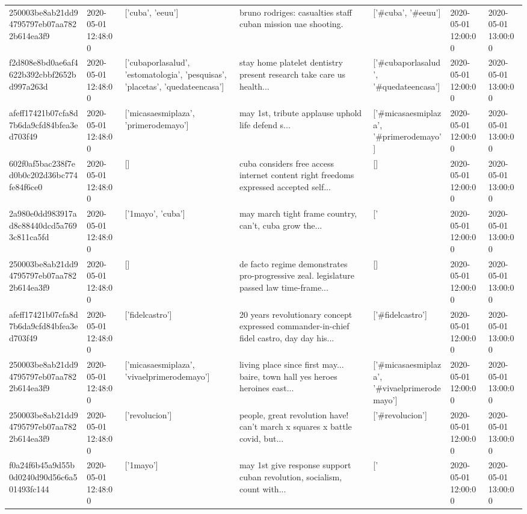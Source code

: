 \begin{tabular}{lllllll}
250003be8ab21dd94795797eb07aa7822b614ea3f9 & 2020-05-01 12:48:00 & ['cuba', 'eeuu'] & bruno rodriges: casualties staff cuban mission uae shooting. & ['#cuba', '#eeuu'] & 2020-05-01 12:00:00 & 2020-05-01 13:00:00 \\
f2d808e8bd0ae6af4622b392cbbf2652bd997a263d & 2020-05-01 12:48:00 & ['cubaporlasalud', 'estomatologia', 'pesquisas', 'placetas', 'quedateencasa'] & stay home platelet dentistry present research take care us health... & ['#cubaporlasalud', '#quedateencasa'] & 2020-05-01 12:00:00 & 2020-05-01 13:00:00 \\
afeff17421b07cfa8d7b6da9cfd84bfea3ed703f49 & 2020-05-01 12:48:00 & ['micasaesmiplaza', 'primerodemayo'] & may 1st, tribute applause uphold life defend s... & ['#micasaesmiplaza', '#primerodemayo'] & 2020-05-01 12:00:00 & 2020-05-01 13:00:00 \\
602f0af5bac238f7ed0b0c202d36bc774fe84f6ce0 & 2020-05-01 12:48:00 & [] & cuba considers free access internet content right freedoms expressed accepted self... & [] & 2020-05-01 12:00:00 & 2020-05-01 13:00:00 \\
2a980e0dd983917ad8c88440dcd5a7693c811ca5fd & 2020-05-01 12:48:00 & ['1mayo', 'cuba'] & may march tight frame country, can't, cuba grow the... & ['#1mayo', '#cuba'] & 2020-05-01 12:00:00 & 2020-05-01 13:00:00 \\
250003be8ab21dd94795797eb07aa7822b614ea3f9 & 2020-05-01 12:48:00 & [] & de facto regime demonstrates pro-progressive zeal. legislature passed law time-frame... & [] & 2020-05-01 12:00:00 & 2020-05-01 13:00:00 \\
afeff17421b07cfa8d7b6da9cfd84bfea3ed703f49 & 2020-05-01 12:48:00 & ['fidelcastro'] & 20 years revolutionary concept expressed commander-in-chief fidel castro, day day his... & ['#fidelcastro'] & 2020-05-01 12:00:00 & 2020-05-01 13:00:00 \\
250003be8ab21dd94795797eb07aa7822b614ea3f9 & 2020-05-01 12:48:00 & ['micasaesmiplaza', 'vivaelprimerodemayo'] & living place since first may... baire, town hall yes heroes heroines east... & ['#micasaesmiplaza', '#vivaelprimerodemayo'] & 2020-05-01 12:00:00 & 2020-05-01 13:00:00 \\
250003be8ab21dd94795797eb07aa7822b614ea3f9 & 2020-05-01 12:48:00 & ['revolucion'] & people, great revolution have! can't march x squares x battle covid, but... & ['#revolucion'] & 2020-05-01 12:00:00 & 2020-05-01 13:00:00 \\
f0a24f6b45a9d55b0d0240d90d56c6a501493fc144 & 2020-05-01 12:48:00 & ['1mayo'] & may 1st give response support cuban revolution, socialism, count with... & ['#1mayo'] & 2020-05-01 12:00:00 & 2020-05-01 13:00:00 \\

\end{tabular}
